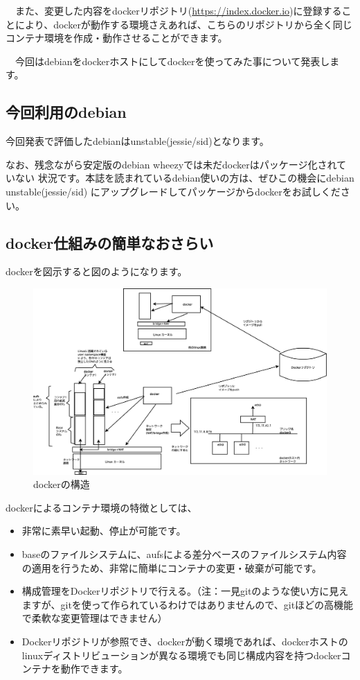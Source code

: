 \documentclass[mingoth,a4paper]{jsarticle}
\begin{document}
　また、変更した内容をdockerリポジトリ(\url{https://index.docker.io})に登録することにより、dockerが動作する環境さえあれば、こちらのリポジトリから全く同じコンテナ環境を作成・動作させることができます。

　今回はdebianをdockerホストにしてdockerを使ってみた事について発表します。

\subsection{今回利用のdebian}

 今回発表で評価したdebianはunstable(jessie/sid)となります。

 なお、残念ながら安定版のdebian wheezyでは未だdockerはパッケージ化されていない
状況です。本誌を読まれているdebian使いの方は、ぜひこの機会にdebian unstable(jessie/sid)
にアップグレードしてパッケージからdockerをお試しください。

\subsection{docker仕組みの簡単なおさらい}

 dockerを図示すると図のようになります。

\begin{figure}[H]
\begin{center}
 \includegraphics[width=1.0\hsize]{image201405/docker-overview.eps}
 \caption{dockerの構造}\label{fig:docker-overview}
\end{center}
\end{figure}

 dockerによるコンテナ環境の特徴としては、

\begin{itemize}
\item 非常に素早い起動、停止が可能です。
\item baseのファイルシステムに、aufsによる差分ベースのファイルシステム内容の適用を行うため、非常に簡単にコンテナの変更・破棄が可能です。
\item 構成管理をDockerリポジトリで行える。（注：一見gitのような使い方に見えますが、gitを使って作られているわけではありませんので、gitほどの高機能で柔軟な変更管理はできません）
\item Dockerリポジトリが参照でき、dockerが動く環境であれば、dockerホストのlinuxディストリビューションが異なる環境でも同じ構成内容を持つdockerコンテナを動作できます。
\end{itemize}
\end{document}
